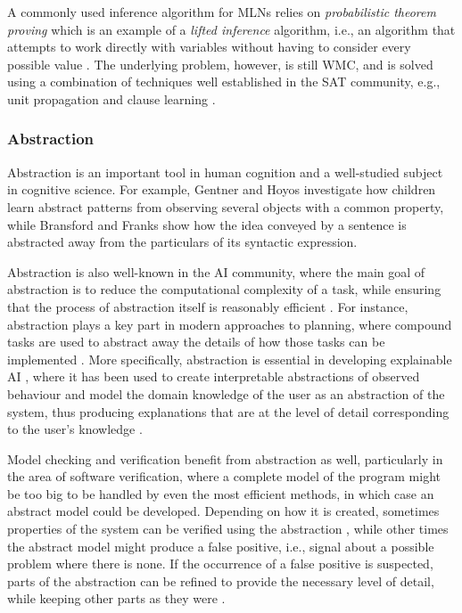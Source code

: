 \documentclass[11pt,english,twocolumn]{article}
\begin{document}
A commonly used inference algorithm for MLNs relies on \emph{probabilistic
  theorem proving}
\cite{DBLP:journals/cacm/GogateD16,DBLP:journals/cib/Venugopal17}
which is an example of a \emph{lifted inference} algorithm, i.e., an algorithm
that attempts to work directly with variables without having to consider every
possible value \cite{DBLP:conf/ijcai/Poole03}. The underlying problem, however,
is still WMC, and is solved using a combination of techniques well established
in the SAT community, e.g., unit propagation and clause learning
\cite{DBLP:journals/cib/Venugopal17}.

\subsubsection*{Abstraction}

Abstraction is an important tool in human cognition and a well-studied subject
in cognitive science. For example, Gentner and Hoyos \cite{Gentner2017-GENAAA-2}
investigate how children learn abstract patterns from observing several
objects with a common property, while Bransford and Franks
\cite{BRANSFORD1971331} show how the idea conveyed by a sentence is abstracted
away from the particulars of its syntactic expression.

Abstraction is also well-known in the AI community,
where the main goal of abstraction is to reduce the computational complexity of
a task, while ensuring that the process of abstraction itself is reasonably
efficient \cite{saitta2013abstraction}. For instance, abstraction plays a key
part in modern approaches to planning, where compound tasks are used to abstract
away the details of how those tasks can be implemented
\cite{DBLP:journals/amai/ErolHN96}. More specifically, abstraction is essential
in developing explainable AI \cite{DBLP:journals/access/AdadiB18}, where
it has been used to create interpretable abstractions of observed behaviour
\cite{DBLP:journals/corr/PenkovR17} and model the domain knowledge of the user
as an abstraction of the system, thus producing explanations that are at the
level of detail corresponding to the user's knowledge
\cite{DBLP:conf/ijcai/SreedharanSK18}.

Model checking and verification benefit from abstraction as well, particularly
in the area of software verification, where a complete model of the program
might be too big to be handled by even the most efficient methods, in which
case an abstract model could be developed. Depending on how it is created,
sometimes properties of the system can be verified using the abstraction
\cite{DBLP:journals/toplas/ClarkeGL94}, while other times the abstract model
might produce a false positive, i.e., signal about a possible problem where
there is none. If the occurrence of a false positive is suspected, parts of the
abstraction can be refined to provide the necessary level of detail, while
keeping other parts as they were
\cite{DBLP:conf/cav/ClarkeGJLV00,DBLP:conf/popl/HenzingerJMS02}.
\end{document}
